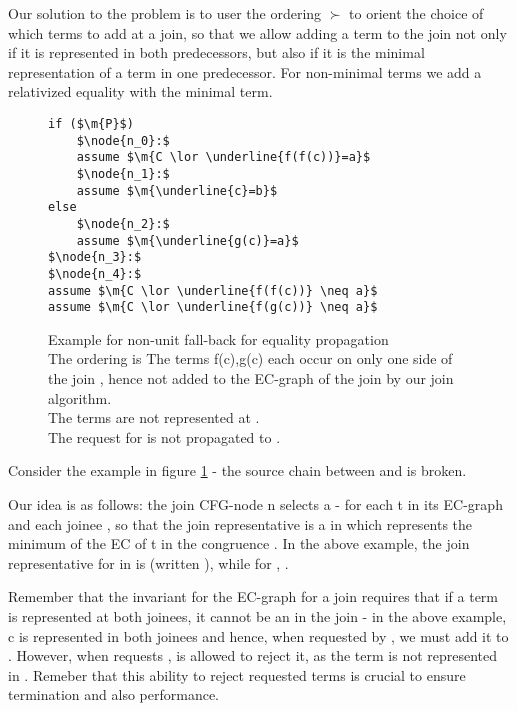 Our solution to the problem is to user the ordering $\succ$ to orient the choice of which terms to add at a join, so that we allow adding a term to the join not only if it is represented in both predecessors, but also if it is the minimal representation of a term in one predecessor. For non-minimal terms we add a relativized equality with the minimal term.

\begin{figure}
\begin{lstlisting}
if ($\m{P}$)
	$\node{n_0}:$
	assume $\m{C \lor \underline{f(f(c))}=a}$
	$\node{n_1}:$
	assume $\m{\underline{c}=b}$
else
	$\node{n_2}:$
	assume $\m{\underline{g(c)}=a}$
$\node{n_3}:$
$\node{n_4}:$
assume $\m{C \lor \underline{f(f(c))} \neq a}$
assume $\m{C \lor \underline{f(g(c))} \neq a}$
\end{lstlisting}
\caption{Example for non-unit fall-back for equality propagation\\
The ordering is 
The terms f(c),g(c) each occur on only one side of the join , 
hence not added to the EC-graph of the join by our join algorithm.\\
The terms  are not represented at .\\
The request for  is not propagated to .
}
\label{snippet_A.3.1}
\end{figure}

Consider the example in figure \ref{snippet_A.3.1} - the source chain between  and  is broken.

Our idea is as follows: the join CFG-node n selects a  -  for each \GT{} t in its EC-graph and each joinee , so that the join representative is a \GT{} in  which represents the minimum of the EC of t in the congruence . In the above example, the join representative for  in  is  (written ), while for , .

Remember that the invariant for the EC-graph for a join requires that if a term is represented at both joinees, it cannot be an \RGFA{} in the join - in the above example, c is represented in both joinees and hence, when requested by , we must add it to .
However, when  requests ,  is allowed to reject it, as the term  is not represented in .
Remeber that this ability to reject requested terms is crucial to ensure termination and also performance.

